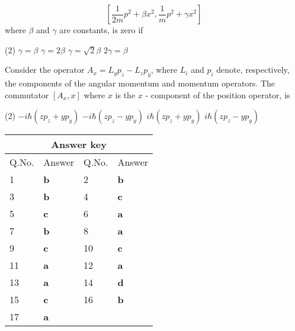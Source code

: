 \begin{enumerate}
\begin{minipage}{\textwidth}
	$$
	\left[\frac{1}{2 m} p^{2}+\beta x^{2}, \frac{1}{m} p^{2}+\gamma x^{2}\right]
	$$
	where $\beta$ and $\gamma$ are constants, is zero if
\end{minipage}
\begin{tasks}(2)
	\task[\textbf{A.}] $\gamma=\beta$
	\task[\textbf{B.}]$\gamma=2 \beta$
	\task[\textbf{C.}]$\gamma=\sqrt{2} \beta$
	\task[\textbf{D.}]$2 \gamma=\beta$
\end{tasks}
\begin{minipage}{\textwidth}
	\item Consider the operator $A_{x}=L_{y} p_{z}-L_{z} p_{y}$, where $L_{i}$ and $p_{i}$ denote, respectively, the components of the angular momentum and momentum operators. The commutator $\left[A_{x}, x\right]$ where $x$ is the $x$ - component of the position operator, is
\end{minipage}
\begin{tasks}(2)
	\task[\textbf{A.}] $-i \hbar\left(z p_{z}+y p_{y}\right)$
	\task[\textbf{B.}]$-i \hbar\left(z p_{z}-y p_{y}\right)$
	\task[\textbf{C.}]$i \hbar\left(z p_{z}+y p_{y}\right)$
	\task[\textbf{D.}]$i \hbar\left(z p_{z}-y p_{y}\right)$
\end{tasks}
\end{enumerate}


\setlength\arrayrulewidth{1pt}
\begin{table}[H]
	\centering
	
	\begin{tabular}{|p{1.5cm}|p{1.5cm}||p{1.5cm}|p{1.5cm}|}
		\hline
		\multicolumn{4}{|c|}{\textbf{Answer key}}\\\hline\hline
		\rowcolor{ocrel}Q.No.&Answer&Q.No.&Answer\\\hline
		1&\textbf{b}&2&\textbf{b}\\\hline
		3&\textbf{b}&4&\textbf{c}\\\hline
		5&\textbf{c}&6&\textbf{a}\\\hline
		7&\textbf{b}&8&\textbf{a}\\\hline
		9&\textbf{c}&10&\textbf{c}\\\hline
		11&\textbf{a}&12&\textbf{a}\\\hline
		13&\textbf{a}&14&\textbf{d}\\\hline
		15&\textbf{c}&16&\textbf{b}\\\hline
		17&\textbf{a}&&\\\hline
	\end{tabular}
\end{table}

























